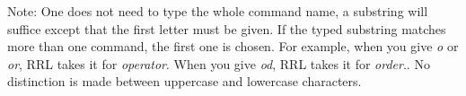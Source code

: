 Note: One does not need to type the whole command name, a 
substring will suffice except
that the first letter must be given. If the typed substring matches more
than one command, the first one is chosen. For example, when you 
give {\em o} or {\em or}, RRL takes it for {\em operator}.
When you give {\em od}, RRL takes it for {\em order}..
No distinction is made between uppercase and lowercase characters.
\normalsize
\rm
